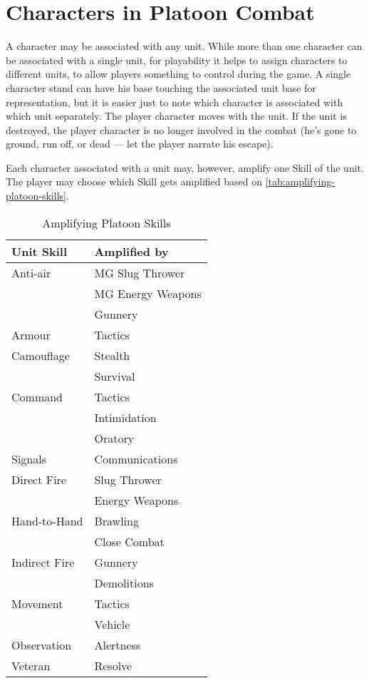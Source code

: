 \iflandscape{}{\vfil}
\section{Characters in Platoon Combat}\label{sec:characters-in-platoon-combat}

A character may be associated with any unit. While more than one character can be associated with a single unit, for playability it helps to assign characters to different units, to allow players something to control during the game. A single character stand can have his base touching the associated unit base for representation, but it is easier just to note which character is associated with which unit separately. The player character moves with the unit. If the unit is destroyed, the player character is no longer involved in the combat (he's gone to ground, run off, or dead --- let the player narrate his escape).

Each character associated with a unit may, however, amplify one Skill of the unit. The player may choose which Skill gets amplified based on \autoref{tab:amplifying-platoon-skills}.

\begin{table}[ht]
\centering
\begin{tabular}{ll}
\toprule
Unit Skill	& Amplified by \\
\midrule
Anti-air	& MG Slug Thrower \\
{}		& MG Energy Weapons \\
{}		& Gunnery \\
Armour		& Tactics \\
Camouflage	& Stealth \\
{}		& Survival \\
Command		& Tactics \\
{}		& Intimidation \\
{}		& Oratory \\
Signals		& Communications \\
Direct Fire	& Slug Thrower \\
{}		& Energy Weapons \\
Hand-to-Hand	& Brawling \\
{}		& Close Combat \\
Indirect Fire	& Gunnery \\
{}		& Demolitions \\
Movement	& Tactics \\
{}		& Vehicle \\
Observation	& Alertness \\
Veteran		& Resolve \\
\bottomrule
\end{tabular}
\caption{Amplifying Platoon Skills}
\label{tab:amplifying-platoon-skills}
\end{table}

